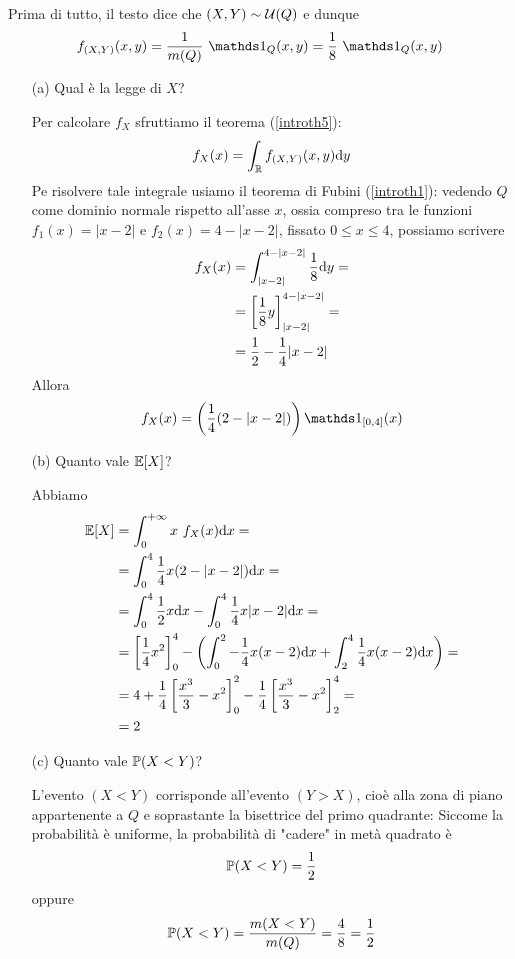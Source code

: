 \Soluzione{}
Prima di tutto, il testo dice che $(X,Y)\sim\mathcal{U}(Q)$ e dunque
\[
\fXYxy=\frac{1}{m(Q)}\ \Ind_Q(x,y)=\frac{1}{8}\ \Ind_Q(x,y)
\]
\begin{enumerate}
\item [(a)] Qual è la legge di $X$?

Per calcolare $f_X$ sfruttiamo il teorema (\ref{introth5}):
\[
f_X(x)=\int_{\mathbb{R}}f_{(X,Y)}(x,y)\mathrm{d} y
\]
Pe risolvere tale integrale usiamo il teorema di Fubini (\ref{introth1}): vedendo $Q$ come dominio normale rispetto all'asse $x$, ossia compreso tra le funzioni $f_1(x)=|x-2|$ e $f_2(x)=4-|x-2|$, fissato $0\leq x\leq4$, possiamo scrivere
\begin{gather*}
\begin{aligned}
f_X(x)&=\int_{|x-2|}^{4-|x-2|}\frac{1}{8}\mathrm{d} y=\\
&=\left[\frac{1}{8} y  \right]_{|x-2|}^{4-|x-2|}=\\
&=\frac{1}{2}-\frac{1}{4}|x-2|
\end{aligned}
\end{gather*}
Allora
\[
f_X(x)=\left(\frac{1}{4}(2-|x-2|)  \right)\Ind_{[0,4]}(x)
\]

\item [(b)] Quanto vale $\mathbb{E}[X]$?

Abbiamo
\begin{gather*}
\begin{aligned}
\mathbb{E}[X]&=\int_{0}^{+\infty} x\ f_X(x)\mathrm{d} x=\\
&=\int_0^4 \frac{1}{4}x(2-|x-2|)\mathrm{d} x=\\
&=\int_0^4 \frac{1}{2}x\mathrm{d} x-\int_0^4 \frac{1}{4}x|x-2|\mathrm{d} x=\\
&=\left[\frac{1}{4}x^2\right]_0^4-\left(\int_0^2 -\frac{1}{4}x(x-2)\mathrm{d} x+\int_2^4 \frac{1}{4}x(x-2)\mathrm{d} x  \right)=\\
&=4+\frac{1}{4}\left[ \frac{x^3}{3}-x^2 \right]_0^2-\frac{1}{4}\left[\frac{x^3}{3}-x^2  \right]_2^4=\\
&=2
\end{aligned}
\end{gather*}

\item [(c)] Quanto vale $\mathbb{P}(X<Y)$?

L'evento $(X<Y)$ corrisponde all'evento $(Y>X)$, cioè alla zona di piano appartenente a $Q$ e soprastante la bisettrice del primo quadrante:
Siccome la probabilità è uniforme, la probabilità di "cadere" in metà quadrato è 
\[
\mathbb{P}(X<Y)=\frac{1}{2}
\]
oppure
\[
\mathbb{P}(X<Y)=\frac{m(X<Y)}{m(Q)}=\frac{4}{8}=\frac{1}{2}
\]


\end{enumerate}
